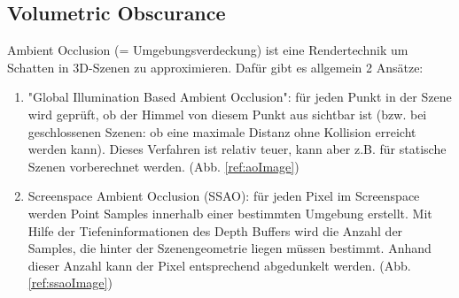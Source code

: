 \documentclass[runningheaders,a4paper]{llncs}
\begin{document}
\subsection{Volumetric Obscurance}

Ambient Occlusion (= Umgebungsverdeckung) ist eine Rendertechnik um Schatten in 3D-Szenen
zu approximieren. Dafür gibt es allgemein 2 Ansätze:
\begin{enumerate}
	\item "Global Illumination Based Ambient Occlusion": für jeden Punkt in der Szene wird geprüft, ob der Himmel von diesem
		Punkt aus sichtbar ist (bzw. bei geschlossenen Szenen: ob eine maximale Distanz ohne Kollision erreicht
		 werden kann). Dieses Verfahren ist relativ teuer, kann aber z.B. für statische Szenen vorberechnet
		 werden. (Abb. \ref{ref:aoImage})
		\cite{aoPaper}
	\item Screenspace Ambient Occlusion (SSAO): für jeden Pixel im Screenspace werden Point Samples
		innerhalb einer bestimmten Umgebung erstellt. Mit Hilfe der Tiefeninformationen des Depth Buffers
		wird die Anzahl der Samples, die hinter der Szenengeometrie liegen müssen bestimmt. Anhand dieser Anzahl
		kann der Pixel entsprechend abgedunkelt werden. (Abb. \ref{ref:ssaoImage})  \cite{cry2Paper}
\end{enumerate}  
\end{document}
